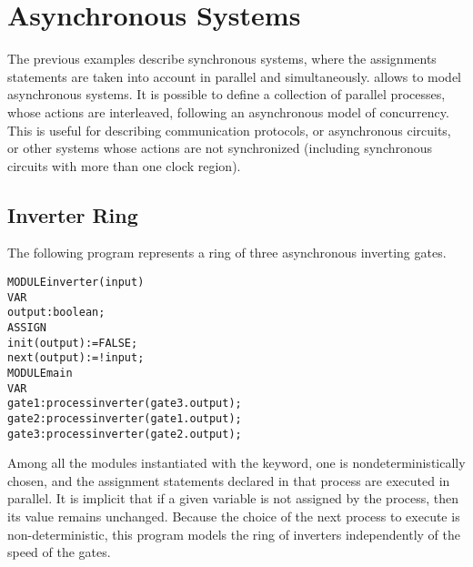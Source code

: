 \section{Asynchronous Systems}
\label{Asynchronous Systems}

%
%
\vspace{3mm}

The previous examples describe synchronous systems, where the
assignments statements are taken into account in parallel and
simultaneously. \nusmv allows to model asynchronous systems.  It
is possible to define a collection of parallel processes, whose actions
are interleaved, following an asynchronous model of concurrency. This
is useful for describing communication protocols, or asynchronous
circuits, or other systems whose actions are not synchronized (including
synchronous circuits with more than one clock region).


\subsection{Inverter Ring}
\label{Inverter Ring}

The following program represents a ring of three asynchronous inverting
gates.\\
\begin{alltt}
MODULE inverter(input)
 VAR
   output : boolean;
 ASSIGN
   init(output) := FALSE;
   next(output) := !input;
MODULE main
 VAR
   gate1 : process inverter(gate3.output);
   gate2 : process inverter(gate1.output);
   gate3 : process inverter(gate2.output);
\end{alltt}
Among all the modules instantiated with the  keyword, one
is nondeterministically chosen, and the assignment statements declared
in that process are executed in parallel. It is implicit that if a given
variable is not assigned by the process, then its value remains
unchanged. Because the choice of the next process to execute is
non-deterministic, this program models the ring of inverters
independently of the speed of the gates. 

